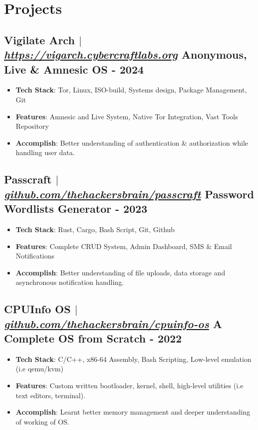\documentclass[11pt]{article} %
\begin{document}
\section{Projects}
\subsection{Vigilate Arch $|$ \normalfont\textit{\href{https://vigarch.cybercraftlabs.org/}{https://vigarch.cybercraftlabs.org}} \hfill Anonymous, Live \& Amnesic OS - \textbf{2024}}
\vspace{3pt}
\begin{itemize}
  \item \textbf{Tech Stack}: Tor, Linux, ISO-build, Systems design, Package Management, Git
  \item \textbf{Features}: Amnesic and Live System, Native Tor Integration, Vast Tools Repository
  \item \textbf{Accomplish}: Better understanding of authentication \& authorization while handling user data.
\end{itemize}

\subsection{Passcraft $|$ \normalfont\textit{\href{https://github.com/thehackersbrain/passcraft}{github.com/thehackersbrain/passcraft}} \hfill Password Wordlists Generator - \textbf{2023}}
\vspace{3pt}
\begin{itemize}
  \item \textbf{Tech Stack}: Rust, Cargo, Bash Script, Git, Github
  \item \textbf{Features}: Complete CRUD System, Admin Dashboard, SMS \& Email Notifications
  \item \textbf{Accomplish}: Better understanding of file uploads, data storage and asynchronous notification handling.
\end{itemize}

\subsection{CPUInfo OS $|$ \normalfont\textit{\href{https://github.com/thehackersbrain/cpuinfo-os}{github.com/thehackersbrain/cpuinfo-os}} \hfill A Complete OS from Scratch - \textbf{2022}}
\vspace{3pt}
\begin{itemize}
  \item \textbf{Tech Stack}: C/C++, x86-64 Assembly, Bash Scripting, Low-level emulation (i.e qemu/kvm)
  \item \textbf{Features}: Custom written bootloader, kernel, shell, high-level utilities (i.e text editors, terminal).
  \item \textbf{Accomplish}: Learnt better memory management and deeper understanding of working of OS.
\end{itemize}
\end{document}
